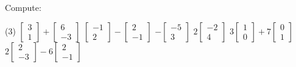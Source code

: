 \begin{exercise}
\pagebreak[2]
Compute:
\begin{tasks}(3)
\task
$\begin{bmatrix}
3 \\
1
\end{bmatrix}
+
\begin{bmatrix}
6 \\
-3
\end{bmatrix}
$
\task
$\begin{bmatrix}
-1 \\
2
\end{bmatrix}
-
\begin{bmatrix}
2 \\
-1
\end{bmatrix}
$
\task
$
-\begin{bmatrix}
-5 \\
3
\end{bmatrix}
$
\task
$
2\begin{bmatrix}
-2 \\
4
\end{bmatrix}
$
\task
$
3\begin{bmatrix}
1 \\
0
\end{bmatrix}
+
7
\begin{bmatrix}
0 \\
1
\end{bmatrix}
$
\task
$
2\begin{bmatrix}
2 \\
-3
\end{bmatrix}
-
6
\begin{bmatrix}
2 \\
-1
\end{bmatrix}
$
\end{tasks}
\end{exercise}

